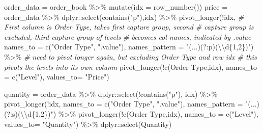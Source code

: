 \documentclass[
  oneside]{book}
\newenvironment{Shaded}{\begin{snugshade}}{\end{snugshade}}
\newcommand{\AttributeTok}[1]{\textcolor[rgb]{0.77,0.63,0.00}{#1}}
\newcommand{\CommentTok}[1]{\textcolor[rgb]{0.56,0.35,0.01}{\textit{#1}}}
\newcommand{\FunctionTok}[1]{\textcolor[rgb]{0.00,0.00,0.00}{#1}}
\newcommand{\NormalTok}[1]{#1}
\newcommand{\OtherTok}[1]{\textcolor[rgb]{0.56,0.35,0.01}{#1}}
\newcommand{\SpecialCharTok}[1]{\textcolor[rgb]{0.00,0.00,0.00}{#1}}
\newcommand{\StringTok}[1]{\textcolor[rgb]{0.31,0.60,0.02}{#1}}
\begin{document}
\begin{Shaded}
\begin{Highlighting}[]
\NormalTok{order\_data }\OtherTok{=}\NormalTok{ order\_book }\SpecialCharTok{\%\textgreater{}\%} \FunctionTok{mutate}\NormalTok{(}\AttributeTok{idx =} \FunctionTok{row\_number}\NormalTok{())}
\NormalTok{price }\OtherTok{=}\NormalTok{ order\_data }\SpecialCharTok{\%\textgreater{}\%}
\NormalTok{  dplyr}\SpecialCharTok{::}\FunctionTok{select}\NormalTok{(}\FunctionTok{contains}\NormalTok{(}\StringTok{"p"}\NormalTok{),idx) }\SpecialCharTok{\%\textgreater{}\%} 
  \FunctionTok{pivot\_longer}\NormalTok{(}\SpecialCharTok{!}\NormalTok{idx,}
               \CommentTok{\# First column is Order Type, takes first capture group, second}
               \CommentTok{\# capture group is excluded, third capture group of levels }
               \CommentTok{\# becomes col names, indicated by .value}
               \AttributeTok{names\_to =} \FunctionTok{c}\NormalTok{(}\StringTok{"Order Type"}\NormalTok{, }\StringTok{".value"}\NormalTok{),}
               \AttributeTok{names\_pattern =} \StringTok{"(...)(?:p)(}\SpecialCharTok{\textbackslash{}\textbackslash{}}\StringTok{d\{1,2\})"}\NormalTok{) }\SpecialCharTok{\%\textgreater{}\%} 
              \CommentTok{\# need to pivot longer again, but excluding Order Type and row idx}
              \CommentTok{\# this pivots the levels into its own column}
  \FunctionTok{pivot\_longer}\NormalTok{(}\SpecialCharTok{!}\FunctionTok{c}\NormalTok{(}\StringTok{\textasciigrave{}}\AttributeTok{Order Type}\StringTok{\textasciigrave{}}\NormalTok{,idx),}
               \AttributeTok{names\_to =} \FunctionTok{c}\NormalTok{(}\StringTok{"Level"}\NormalTok{),}
               \AttributeTok{values\_to=} \StringTok{"Price"}\NormalTok{) }

\NormalTok{quantity }\OtherTok{=}\NormalTok{ order\_data }\SpecialCharTok{\%\textgreater{}\%}
\NormalTok{  dplyr}\SpecialCharTok{::}\FunctionTok{select}\NormalTok{(}\SpecialCharTok{!}\FunctionTok{contains}\NormalTok{(}\StringTok{"p"}\NormalTok{), idx) }\SpecialCharTok{\%\textgreater{}\%} 
  \FunctionTok{pivot\_longer}\NormalTok{(}\SpecialCharTok{!}\NormalTok{idx,}
               \AttributeTok{names\_to =} \FunctionTok{c}\NormalTok{(}\StringTok{"Order Type"}\NormalTok{, }\StringTok{".value"}\NormalTok{),}
               \AttributeTok{names\_pattern =} \StringTok{"(...)(?:s)(}\SpecialCharTok{\textbackslash{}\textbackslash{}}\StringTok{d\{1,2\})"}\NormalTok{) }\SpecialCharTok{\%\textgreater{}\%} 
  \FunctionTok{pivot\_longer}\NormalTok{(}\SpecialCharTok{!}\FunctionTok{c}\NormalTok{(}\StringTok{\textasciigrave{}}\AttributeTok{Order Type}\StringTok{\textasciigrave{}}\NormalTok{,idx),}
               \AttributeTok{names\_to =} \FunctionTok{c}\NormalTok{(}\StringTok{"Level"}\NormalTok{),}
               \AttributeTok{values\_to=} \StringTok{"Quantity"}\NormalTok{) }\SpecialCharTok{\%\textgreater{}\%} 
\NormalTok{  dplyr}\SpecialCharTok{::}\FunctionTok{select}\NormalTok{(Quantity)}


\end{Highlighting}
\end{Shaded}
\end{document}
